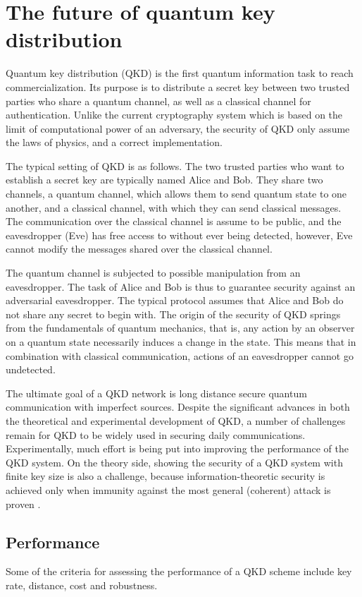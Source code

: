\section{The future of quantum key distribution}
% 
Quantum key distribution (QKD) is the first quantum information task
to reach commercialization. Its purpose is to distribute a secret
key between two trusted parties who share a quantum channel,
as well as a classical channel for authentication. Unlike the current
cryptography system which is based on the limit of computational power of an adversary, the security of QKD only assume the laws of physics, and a 
correct implementation.


The typical setting of QKD is as follows. The two trusted parties who
want to establish a secret key are typically named Alice and Bob.
They share two channels, a quantum channel, which allows them to send
quantum state to one another, and a classical channel, with which they can
send classical messages. The communication over the classical channel is
assume to be public, and the eavesdropper (Eve) has free access to without 
ever being detected, however, Eve cannot modify the messages shared over
the classical channel.

 The quantum channel is subjected to possible manipulation from an
 eavesdropper. The task of Alice and Bob is thus to guarantee security
against an adversarial eavesdropper. The typical protocol assumes that
Alice and Bob do not share any secret to begin with.
The origin of the security of QKD springs from the fundamentals
of quantum mechanics, that is, any action by an observer on
a quantum state necessarily induces a change in the state. This means
that in combination with classical communication, actions of an eavesdropper cannot go undetected.


The ultimate goal of a QKD network is long distance secure quantum communication with imperfect sources.
% 
Despite the significant advances in both the theoretical and experimental development of QKD, a number of challenges remain for QKD to be widely used 
in securing daily communications\cite{RevModPhys.81.1301,diamanti2016practical}. Experimentally, much effort is being put into improving the performance of the QKD system. On the theory side, 
showing the security of a QKD system with finite key size is also a challenge,  
because information-theoretic security is achieved only when immunity against the most general (coherent) attack is proven \cite{diamanti2016practical}.


\subsection{Performance}
Some of the criteria for assessing the performance of a QKD scheme include key rate, distance, cost and robustness.
% 

